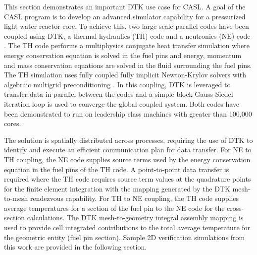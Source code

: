 \documentclass{mc2013}
\begin{document}
\label{sec:examples}

This section demonstrates an important DTK use case for CASL.  A goal of
the CASL program \cite{u.s._department_of_energy_casl_2011} is to
develop an advanced simulator capability for a pressurized light water
reactor core.  To achieve this, two large-scale parallel codes have
been coupled using DTK, a thermal hydraulics (TH) code
\cite{drekar_cfd} and a neutronics (NE) code \cite{denovo_2010}.  The
TH code performs a multiphysics conjugate heat transfer simulation
where energy conservation equation is solved in the fuel pins and
energy, momentum and mass conservation equations are solved in the
fluid surrounding the fuel pins.  The TH simulation uses fully coupled
fully implicit Newton-Krylov solvers with algebraic multigrid
preconditioning \cite{shadid_2006}.  In this coupling, DTK is
leveraged to transfer data in parallel between the codes and a simple
block Gauss-Siedel iteration loop is used to converge the global
coupled system.  Both codes have been demonstrated to run on
leadership class machines with greater than 100,000 cores.

The solution is spatially distributed across processes, requiring the
use of DTK to identify and execute an efficient communication plan for
data transfer.  For NE to TH coupling, the NE code supplies source
terms used by the energy conservation equation in the fuel pins of the
TH code.  A point-to-point data transfer is required where the TH code
requires source term values at the quadrature points for the finite
element integration with the mapping generated by the DTK mesh-to-mesh
rendezvous capability.  For TH to NE coupling, the TH code supplies
average temperatures for a section of the fuel pin to the NE code for
the cross-section calculations.  The DTK mesh-to-geometry integral
assembly mapping is used to provide cell integrated contributions to
the total average temperature for the geometric entity (fuel pin
section).  Sample 2D verification simulations from this work are
provided in the following section.

\label{subsec:cht}
\end{document}
